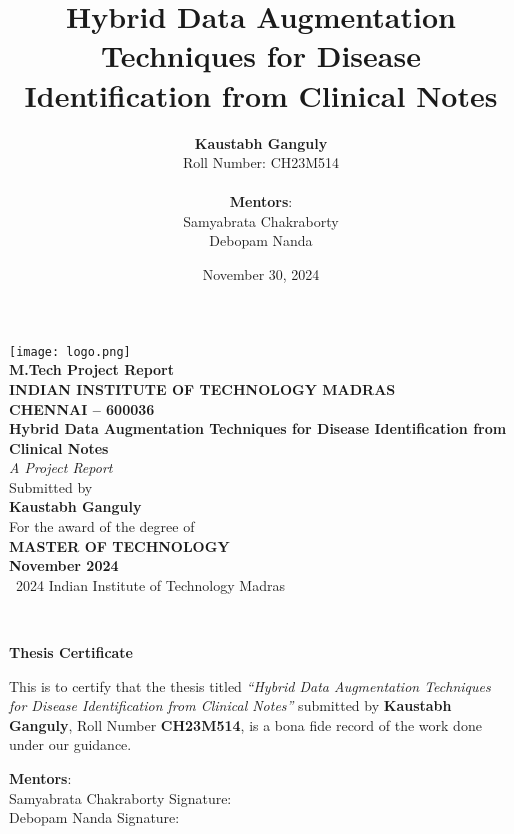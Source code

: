 \documentclass[12pt,a4paper]{report}
\title{\textbf{Hybrid Data Augmentation Techniques for Disease Identification from Clinical Notes}}
\author{
    \textbf{Kaustabh Ganguly} \\
    Roll Number: CH23M514 \\
    \\
    \textbf{Mentors}: \\
    Samyabrata Chakraborty \\
    Debopam Nanda \\
}
\date{November 30, 2024}
\begin{document}
\begin{titlepage}
    \centering
    \texttt{[image: logo.png]} \\
    \vspace{0.5cm}
    {\large \bfseries M.Tech Project Report\\
    INDIAN INSTITUTE OF TECHNOLOGY MADRAS \\
    CHENNAI -- 600036} \\
    \vspace{1.5cm}
    {\huge \bfseries Hybrid Data Augmentation Techniques for Disease Identification from Clinical Notes} \\
    \vspace{2cm}
    {\Large \textit{A Project Report}} \\
    \vspace{0.5cm}
    {\large Submitted by} \\
    \vspace{0.5cm}
    {\Large \bfseries Kaustabh Ganguly} \\
    \vspace{0.5cm}
    {\large For the award of the degree of} \\
    \vspace{0.5cm}
    {\Large \bfseries MASTER OF TECHNOLOGY} \\
    \vspace{1.5cm}
    {\large \bfseries November 2024} \\
    \vfill
    {\small \textcopyright~2024 Indian Institute of Technology Madras}
\end{titlepage}

\newpage
~\vfill
\begin{center}
    \textbf{Thesis Certificate}
\end{center}
\vspace{0.5in}
This is to certify that the thesis titled \textit{``Hybrid Data Augmentation Techniques for Disease Identification from Clinical Notes''} submitted by \textbf{Kaustabh Ganguly}, Roll Number \textbf{CH23M514}, is a bona fide record of the work done under our guidance. \\

\vspace{1in}

\noindent \textbf{Mentors}: \\
Samyabrata Chakraborty \hfill Signature: \\
Debopam Nanda \hfill Signature: \\
\end{document}
